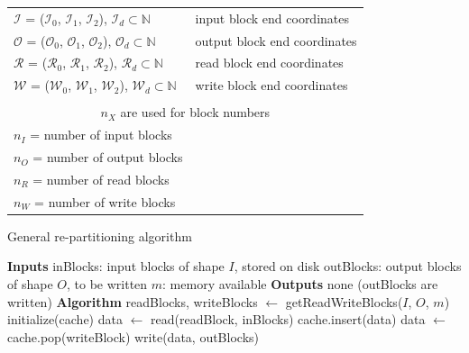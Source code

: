 \documentclass[sigconf, nonacm]{acmart}
\begin{document}
\begin{table}
\begin{tabular}{ll}
    $\mathcal{I}$ = ($\mathcal{I}_0$, $\mathcal{I}_1$, $\mathcal{I}_2$), \enskip $\mathcal{I}_d \subset \mathbb{N} $ & input block end coordinates \\
    $\mathcal{O}$ = ($\mathcal{O}_0$, $\mathcal{O}_1$, $\mathcal{O}_2$), \enskip $\mathcal{O}_d \subset \mathbb{N} $ & output block end coordinates\\
    $\mathcal{R}$ = ($\mathcal{R}_0$, $\mathcal{R}_1$, $\mathcal{R}_2$), \enskip $\mathcal{R}_d \subset \mathbb{N} $ & read block end coordinates\\
    $\mathcal{W}$ = ($\mathcal{W}_0$, $\mathcal{W}_1$, $\mathcal{W}_2$), \enskip $\mathcal{W}_d \subset \mathbb{N} $ & write block end coordinates\\
    &\\
    \multicolumn{2}{c}{\cellcolor{black!25}$n_X$ are used for block numbers}\\
    $n_I$ = number of input blocks\\
    $n_O$ = number of output blocks\\
    $n_R$ = number of read blocks\\
    $n_W$ = number of write blocks\\
  \end{tabular}
  \label{table:notations}
\end{table}

\begin{algorithm}[b]
  \caption{General re-partitioning algorithm}
  \label{algo:generalrepartition}
  \begin{algorithmic}[1]
    \STATE \textbf{Inputs}
    \STATE inBlocks: input blocks of shape $I$, stored on disk
    \STATE outBlocks: output blocks of shape $O$, to be written
    \STATE $m$: memory available
    \STATE
    \STATE \textbf{Outputs}
    \STATE none (outBlocks are written)
    \STATE
    \STATE \textbf{Algorithm}
    \STATE readBlocks, writeBlocks $\leftarrow$ getReadWriteBlocks($I$, $O$, $m$)
    \STATE initialize(cache)
      \STATE data $\leftarrow$ read(readBlock, inBlocks)
      \STATE cache.insert(data)
          \STATE data $\leftarrow$ cache.pop(writeBlock)
          \STATE write(data, outBlocks)
        \ENDIF
      \ENDFOR
    \ENDFOR

  \end{algorithmic}
\end{algorithm}
\end{document}
